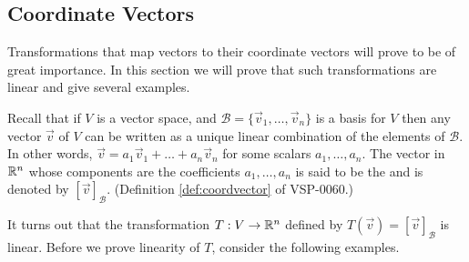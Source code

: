 \documentclass{ximera}
\begin{document}
\subsection*{Coordinate Vectors}
Transformations that map vectors to their coordinate vectors will prove to be of great importance.  In this section we will prove that such transformations are linear and give several examples.

Recall that if $V$ is a vector space, and  $\mathcal{B}=\{\vec{v}_1, \ldots ,\vec{v}_n\}$ is a basis for $V$ then any vector $\vec{v}$ of $V$ can be written as a unique linear combination of the elements of $\mathcal{B}$.  In other words, $\vec{v}=a_1\vec{v}_1+\ldots +a_n\vec{v}_n$ for some scalars $a_1, \ldots ,a_n$.  The vector in $\mathbb{R}^n$ whose components are the coefficients $a_1, \ldots ,a_n$  is said to be the  and is denoted by $[\vec{v}]_{\mathcal{B}}$.  (Definition \ref{def:coordvector} of VSP-0060.)  

It turns out that the transformation $T:V\rightarrow \mathbb{R}^n$ defined by $T(\vec{v})=[\vec{v}]_{\mathcal{B}}$ is linear.  Before we prove linearity of $T$, consider the following examples.
\end{document}
